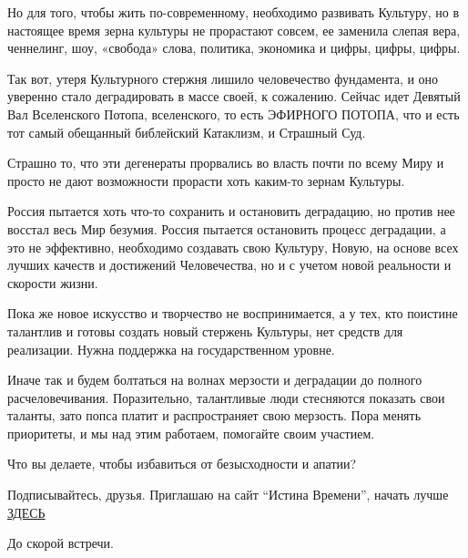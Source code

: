 Но для того, чтобы жить по-современному, необходимо развивать Культуру, но в
настоящее время зерна культуры не прорастают совсем, ее заменила слепая вера,
ченнелинг, шоу, «свобода» слова, политика, экономика и цифры, цифры, цифры.

\begin{zznagolos}
Так вот, утеря Культурного стержня лишило человечество фундамента, и оно
уверенно стало деградировать в массе своей, к сожалению. Сейчас идет Девятый
Вал Вселенского Потопа, вселенского, то есть ЭФИРНОГО ПОТОПА, что и есть тот
самый обещанный библейский Катаклизм, и Страшный Суд.	
\end{zznagolos}

Страшно то, что эти дегенераты прорвались во власть почти по всему Миру и
просто не дают возможности прорасти хоть каким-то зернам Культуры.

Россия пытается хоть что-то сохранить и остановить деградацию, но против нее
восстал весь Мир безумия. Россия пытается остановить процесс деградации, а это
не эффективно, необходимо создавать свою Культуру, Новую, на основе всех лучших
качеств и достижений Человечества, но и с учетом новой реальности и скорости
жизни.

Пока же новое искусство и творчество не воспринимается, а у тех, кто поистине
талантлив и готовы создать новый стержень Культуры, нет средств для реализации.
Нужна поддержка на государственном уровне.

Иначе так и будем болтаться на волнах мерзости и деградации до полного
расчеловечивания. Поразительно, талантливые люди стесняются показать свои
таланты, зато попса платит и распространяет свою мерзость. Пора менять
приоритеты, и мы над этим работаем, помогайте своим участием.

Что вы делаете, чтобы избавиться от безысходности и апатии?

Подписывайтесь, друзья. Приглашаю на сайт \enquote{Истина Времени}, начать лучше 
\href{https://istinavremeni.ru/yasnovidenie/treningi}{ЗДЕСЬ}

До скорой встречи.
